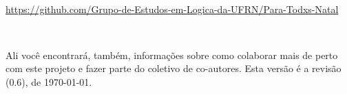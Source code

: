 \

\hbox{{\footnotesize \url{https://github.com/Grupo-de-Estudos-em-Logica-da-UFRN/Para-Todxs-Natal}}} 

\

\noindent Ali você encontrará, também, informações sobre como colaborar mais de perto com este projeto e fazer parte do coletivo de co-autores.
Esta versão é a revisão (0.6), de \today.



